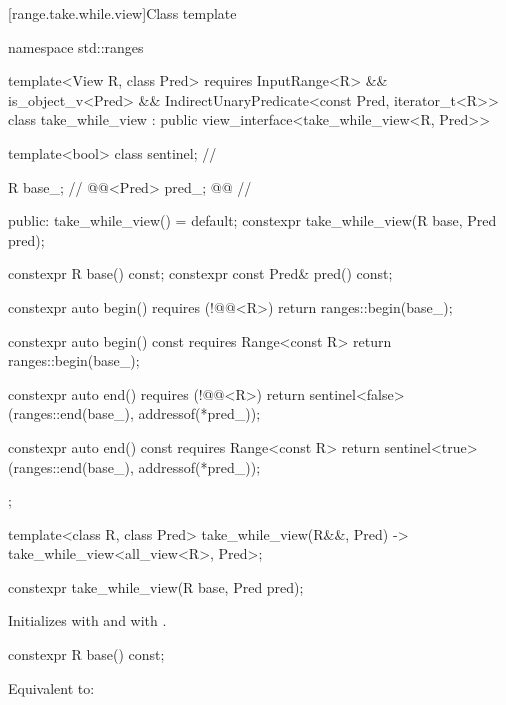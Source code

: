 [range.take.while.view]{Class template }

\begin{codeblock}
namespace std::ranges {
  template<View R, class Pred>
  requires InputRange<R> && is_object_v<Pred> &&
    IndirectUnaryPredicate<const Pred, iterator_t<R>>
  class take_while_view : public view_interface<take_while_view<R, Pred>> {
    template<bool> class sentinel;                      // \expos

    R base_;                                            // \expos
    @@<Pred> pred_; @\itcorr[-1]@                       // \expos

  public:
    take_while_view() = default;
    constexpr take_while_view(R base, Pred pred);

    constexpr R base() const;
    constexpr const Pred& pred() const;

    constexpr auto begin() requires (!@@<R>)
    { return ranges::begin(base_); }

    constexpr auto begin() const requires Range<const R>
    { return ranges::begin(base_); }

    constexpr auto end() requires (!@@<R>)
    { return sentinel<false>(ranges::end(base_), addressof(*pred_)); }

    constexpr auto end() const requires Range<const R>
    { return sentinel<true>(ranges::end(base_), addressof(*pred_)); }
  };

  template<class R, class Pred>
    take_while_view(R&&, Pred) -> take_while_view<all_view<R>, Pred>;
}
\end{codeblock}

\begin{itemdecl}
constexpr take_while_view(R base, Pred pred);
\end{itemdecl}

\begin{itemdescr}
\pnum
\effects
Initializes  with  and
 with .
\end{itemdescr}

\begin{itemdecl}
constexpr R base() const;
\end{itemdecl}

\begin{itemdescr}
\pnum
\effects
Equivalent to: 
\end{itemdescr}

